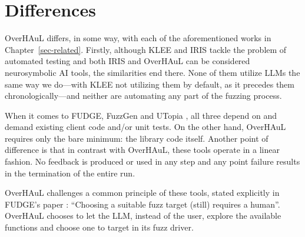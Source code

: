 \documentclass[
  a4paper,
]{scrreprt}
\theoremstyle{definition}
\theoremstyle{remark}
\begin{document}
\section{Differences}\label{sec-differences}

OverHAuL differs, in some way, with each of the aforementioned works in
Chapter~\ref{sec-related}. Firstly, although KLEE and IRIS
\autocite{iris,klee} tackle the problem of automated testing and both
IRIS and OverHAuL can be considered neurosymbolic AI tools, the
similarities end there. None of them utilize LLMs the same way we
do---with KLEE not utilizing them by default, as it precedes them
chronologically---and neither are automating any part of the fuzzing
process.

When it comes to FUDGE, FuzzGen and UTopia
\autocite{utopia,fuzzgen,fudge}, all three depend on and demand existing
client code and/or unit tests. On the other hand, OverHAuL requires only
the bare minimum: the library code itself. Another point of difference
is that in contrast with OverHAuL, these tools operate in a linear
fashion. No feedback is produced or used in any step and any point
failure results in the termination of the entire run.

OverHAuL challenges a common principle of these tools, stated explicitly
in FUDGE's paper \autocite{fudge}: ``Choosing a suitable fuzz target
(still) requires a human''. OverHAuL chooses to let the LLM, instead of
the user, explore the available functions and choose one to target in
its fuzz driver.
\end{document}
